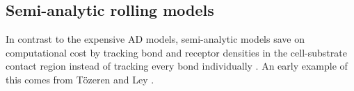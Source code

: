 \subsection{Semi-analytic rolling models}
\label{sec:semi-analytic}

In contrast to the expensive AD models, semi-analytic models save on
computational cost by tracking bond and receptor densities in the
cell-substrate contact region instead of tracking every bond
individually \cite{Pospieszalska2009}. An early example of this comes
from T\"{o}zeren and Ley \cite{Tozeren1992}. %
